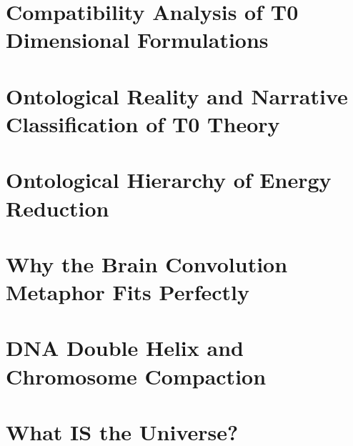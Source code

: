 	\chapter{Compatibility Analysis of T0 Dimensional Formulations}
	
	\chapter{Ontological Reality and Narrative Classification of T0 Theory}
	
	\chapter{Ontological Hierarchy of Energy Reduction}
	
	\chapter{Why the Brain Convolution Metaphor Fits Perfectly}
	
	\chapter{DNA Double Helix and Chromosome Compaction}
	
	\chapter{What IS the Universe?}
	
	
